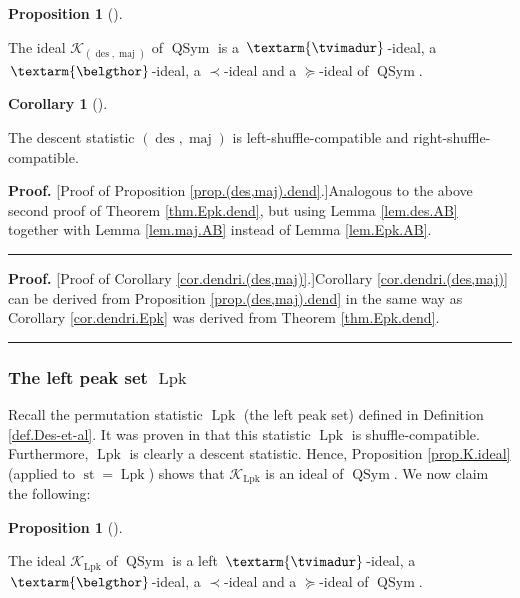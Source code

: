 \documentclass[numbers=enddot,12pt,final,onecolumn,notitlepage]{scrartcl}%
\theoremstyle{definition}
\newtheorem{prop}[theo]{Proposition}
\newenvironment{proposition}[1][]
{\begin{prop}[#1]\begin{leftbar}}
{\end{leftbar}\end{prop}}
\newtheorem{coro}[theo]{Corollary}
\newenvironment{corollary}[1][]
{\begin{coro}[#1]\begin{leftbar}}
{\end{leftbar}\end{coro}}
\newenvironment{proof}[1][Proof]{\noindent\textbf{#1.} }{\ \rule{0.5em}{0.5em}}
\newenvironment{verlong}{}{}
\newcommand{\tvi}{\left. \textarm{\tvimadur} \right.}
\newcommand{\bel}{\left. \textarm{\belgthor} \right.}
\begin{document}
\begin{verlong}
\begin{proposition}
\label{prop.(des,maj).dend}The ideal $\mathcal{K}_{\left(  \operatorname*{des}%
,\operatorname*{maj}\right)  }$ of $\operatorname*{QSym}$ is a $\tvi$-ideal, a
$\bel$-ideal, a $\left.  \prec\right.  $-ideal and a $\left.  \succeq\right.
$-ideal of $\operatorname*{QSym}$.
\end{proposition}

\begin{corollary}
\label{cor.dendri.(des,maj)}The descent statistic $\left(  \operatorname*{des}%
,\operatorname*{maj}\right)  $ is left-shuffle-compatible and right-shuffle-compatible.
\end{corollary}

\begin{proof}
[Proof of Proposition \ref{prop.(des,maj).dend}.]Analogous to the above second
proof of Theorem \ref{thm.Epk.dend}, but using Lemma \ref{lem.des.AB} together
with Lemma \ref{lem.maj.AB} instead of Lemma \ref{lem.Epk.AB}.
\end{proof}

\begin{proof}
[Proof of Corollary \ref{cor.dendri.(des,maj)}.]Corollary
\ref{cor.dendri.(des,maj)} can be derived from Proposition
\ref{prop.(des,maj).dend} in the same way as Corollary \ref{cor.dendri.Epk}
was derived from Theorem \ref{thm.Epk.dend}.
\end{proof}

\subsubsection{The left peak set $\operatorname*{Lpk}$}

Recall the permutation statistic $\operatorname*{Lpk}$ (the left peak set)
defined in Definition \ref{def.Des-et-al}. It was proven in \cite[Theorem 4.9
\textbf{(a)}]{part1} that this statistic $\operatorname*{Lpk}$ is
shuffle-compatible. Furthermore, $\operatorname*{Lpk}$ is clearly a descent
statistic. Hence, Proposition \ref{prop.K.ideal} (applied to
$\operatorname*{st}=\operatorname*{Lpk}$) shows that $\mathcal{K}%
_{\operatorname*{Lpk}}$ is an ideal of $\operatorname*{QSym}$. We now claim
the following:

\begin{proposition}
\label{prop.Lpk.dend}The ideal $\mathcal{K}_{\operatorname*{Lpk}}$ of
$\operatorname*{QSym}$ is a left $\tvi$-ideal, a $\bel$-ideal, a $\left.
\prec\right.  $-ideal and a $\left.  \succeq\right.  $-ideal of
$\operatorname*{QSym}$.
\end{proposition}


\end{verlong}
\end{document}
